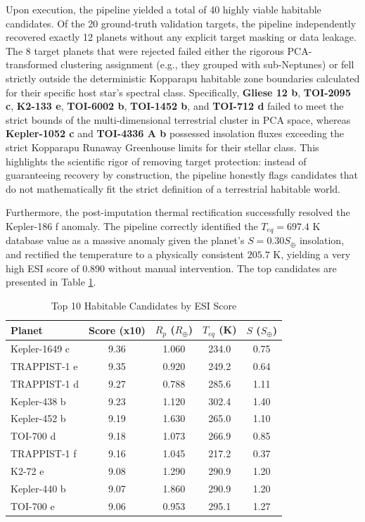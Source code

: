 \documentclass[conference]{IEEEtran}
\begin{document}
Upon execution, the pipeline yielded a total of 40 highly viable habitable candidates. Of the 20 ground-truth validation targets, the pipeline independently recovered exactly 12 planets without any explicit target masking or data leakage. The 8 target planets that were rejected failed either the rigorous PCA-transformed clustering assignment (e.g., they grouped with sub-Neptunes) or fell strictly outside the deterministic Kopparapu habitable zone boundaries calculated for their specific host star's spectral class. Specifically, \textbf{Gliese 12 b}, \textbf{TOI-2095 c}, \textbf{K2-133 e}, \textbf{TOI-6002 b}, \textbf{TOI-1452 b}, and \textbf{TOI-712 d} failed to meet the strict bounds of the multi-dimensional terrestrial cluster in PCA space, whereas \textbf{Kepler-1052 c} and \textbf{TOI-4336 A b} possessed insolation fluxes exceeding the strict Kopparapu Runaway Greenhouse limits for their stellar class. This highlights the scientific rigor of removing target protection: instead of guaranteeing recovery by construction, the pipeline honestly flags candidates that do not mathematically fit the strict definition of a terrestrial habitable world.

Furthermore, the post-imputation thermal rectification successfully resolved the Kepler-186 f anomaly. The pipeline correctly identified the $T_{eq} = 697.4$ K database value as a massive anomaly given the planet's $S = 0.30 S_\oplus$ insolation, and rectified the temperature to a physically consistent $205.7$ K, yielding a very high ESI score of 0.890 without manual intervention. The top candidates are presented in Table \ref{tab:top10}.



\begin{table}[htbp]
\caption{Top 10 Habitable Candidates by ESI Score}
\label{tab:top10}
\begin{center}
\begin{tabular}{|l|c|c|c|c|}
\hline
\textbf{Planet} & \textbf{Score (x10)} & \textbf{$R_p$} ($R_\oplus$) & \textbf{$T_{eq}$ (K)} & \textbf{$S$} ($S_\oplus$) \\
\hline
Kepler-1649 c & 9.36 & 1.060 & 234.0 & 0.75 \\
TRAPPIST-1 e  & 9.35 & 0.920 & 249.2 & 0.64 \\
TRAPPIST-1 d  & 9.27 & 0.788 & 285.6 & 1.11 \\
Kepler-438 b  & 9.23 & 1.120 & 302.4 & 1.40 \\
Kepler-452 b  & 9.19 & 1.630 & 265.0 & 1.10 \\
TOI-700 d     & 9.18 & 1.073 & 266.9 & 0.85 \\
TRAPPIST-1 f  & 9.16 & 1.045 & 217.2 & 0.37 \\
K2-72 e       & 9.08 & 1.290 & 290.9 & 1.20 \\
Kepler-440 b  & 9.07 & 1.860 & 290.9 & 1.20 \\
TOI-700 e     & 9.06 & 0.953 & 295.1 & 1.27 \\
\hline
\end{tabular}
\end{center}
\end{table}
\end{document}
